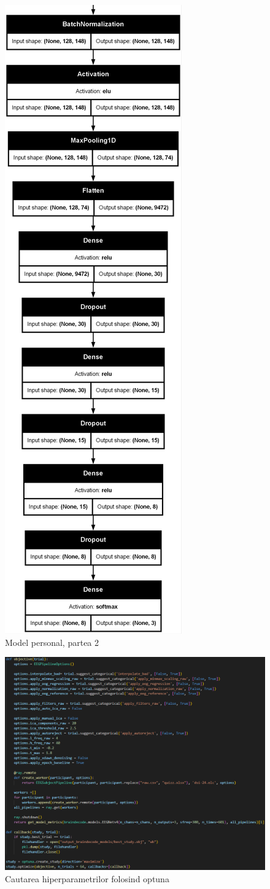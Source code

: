 \begin{figure}
    \centering
    \includegraphics[width=0.4\linewidth]{model_part2.png}
    \caption{Model personal, partea 2}
    \label{fig:model_part2}
\end{figure}

\begin{figure}
    \centering
    \includegraphics[width=1\linewidth]{optuna_study.png}
    \caption{Cautarea hiperparametrilor folosind optuna}
    \label{fig:optuna_search}
\end{figure}

